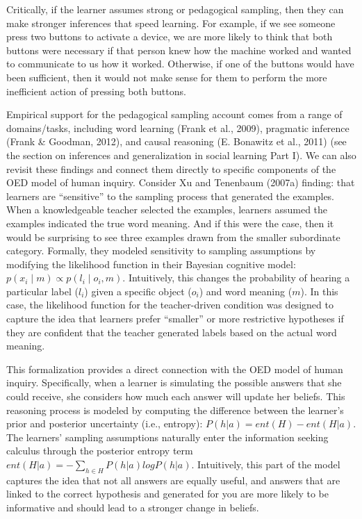 \documentclass[english,floatsintext,man]{apa6}
\theoremstyle{definition}
\theoremstyle{definition}
\theoremstyle{definition}
\theoremstyle{remark}
\begin{document}
\noindent
Critically, if the learner assumes strong or pedagogical sampling, then
they can make stronger inferences that speed learning. For example, if
we see someone press two buttons to activate a device, we are more
likely to think that both buttons were necessary if that person knew how
the machine worked and wanted to communicate to us how it worked.
Otherwise, if one of the buttons would have been sufficient, then it
would not make sense for them to perform the more inefficient action of
pressing both buttons.

Empirical support for the pedagogical sampling account comes from a
range of domains/tasks, including word learning (Frank et al., 2009),
pragmatic inference (Frank \& Goodman, 2012), and causal reasoning (E.
Bonawitz et al., 2011) (see the section on inferences and generalization
in social learning Part I). We can also revisit these findings and
connect them directly to specific components of the OED model of human
inquiry. Consider Xu and Tenenbaum (2007a) finding: that learners are
\enquote{sensitive} to the sampling process that generated the examples.
When a knowledgeable teacher selected the examples, learners assumed the
examples indicated the true word meaning. And if this were the case,
then it would be surprising to see three examples drawn from the smaller
subordinate category. Formally, they modeled sensitivity to sampling
assumptions by modifying the likelihood function in their Bayesian
cognitive model: \(p(x_i \mid m) \propto p(l_i \mid o_i, m)\).
Intuitively, this changes the probability of hearing a particular label
(\(l_i\)) given a specific object (\(o_i\)) and word meaning (\(m\)). In
this case, the likelihood function for the teacher-driven condition was
designed to capture the idea that learners prefer \enquote{smaller} or
more restrictive hypotheses if they are confident that the teacher
generated labels based on the actual word meaning.

This formalization provides a direct connection with the OED model of
human inquiry. Specifically, when a learner is simulating the possible
answers that she could receive, she considers how much each answer will
update her beliefs. This reasoning process is modeled by computing the
difference between the learner's prior and posterior uncertainty (i.e.,
entropy): \(P(h|a) = ent(H) - ent(H|a)\). The learners' sampling
assumptions naturally enter the information seeking calculus through the
posterior entropy term \(ent(H|a) = -\sum_{h\in H}{P(h|a)logP(h|a)}\).
Intuitively, this part of the model captures the idea that not all
answers are equally useful, and answers that are linked to the correct
hypothesis and generated for you are more likely to be informative and
should lead to a stronger change in beliefs.
\end{document}
